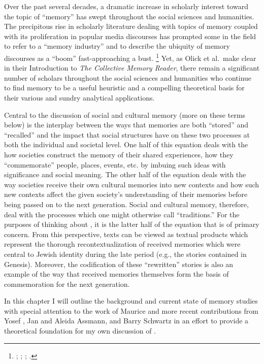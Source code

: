 
Over the past several decades, a dramatic increase in scholarly interest toward the topic of ``memory'' has swept throughout the social sciences and humanities. The precipitous rise in scholarly literature dealing with topics of memory coupled with its proliferation in popular media discourses has prompted some in the field to refer to a ``memory industry'' and to describe the ubiquity of memory discourses as a ``boom'' fast-approaching a bust.%
%
\footnote{\cite{rosenfeld_jmh2009}; \cite{winter2006}; \cite{berliner_aq2005}; \cite{confino_ahr1997}.}
%
Yet, as Olick et al.~make clear in their Introduction to \emph{The Collective Memory Reader}, there remain a significant number of scholars throughout the social sciences and humanities who continue to find memory to be a useful heuristic and a compelling theoretical basis for their various and sundry analytical applications.\autocite[3--6]{olick_olick-etal2011}

Central to the discussion of social and cultural memory (more on these terms below) is the interplay between the ways that memories are both ``stored'' and ``recalled'' and the impact that social structures have on these two processes at both the individual and societal level. One half of this equation deals with the how societies construct the memory of their shared experiences, how they ``commemorate'' people, places, events, etc. by imbuing such ideas with significance and social meaning. The other half of the equation deals with the way societies receive their own cultural memories into new contexts and how such new contexts affect the given society's understanding of their memories before being passed on to the next generation. Social and cultural memory, therefore, deal with the processes which one might otherwise call ``traditions.'' For the purposes of thinking about \rwb, it is the latter half of the equation that is of primary concern. From this perspective, \rwb texts can be viewed as textual products which represent the thorough recontextualization of received memories which were central to Jewish identity during the late \secondtemple period (e.g., the stories contained in Genesis). Moreover, the codification of these ``rewritten'' stories is also an example of the way that received memories themselves form the basis of commemoration for the next generation.

In this chapter I will outline the background and current state of memory studies with special attention to the work of Maurice \halbwachs and more recent contributions from Yosef \yerushalmi, Jan and Aleida Assmann, and Barry Schwartz in an effort to provide a theoretical foundation for my own discussion of \rwb.